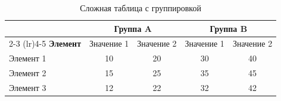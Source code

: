 \documentclass[12pt,a4paper]{article}
\begin{document}
\begin{table}[h!]
    \centering
    \caption{Сложная таблица с группировкой}
    \label{tab:complex}
    
    \begin{tabular}{lcccc}
        \toprule
                          & \multicolumn{2}{c}{\textbf{Группа A}} & \multicolumn{2}{c}{\textbf{Группа B}} \\
        \cmidrule(lr){2-3} \cmidrule(lr){4-5}
        \textbf{Элемент}  & Значение 1      & Значение 2      & Значение 1      & Значение 2      \\
        \midrule
        Элемент 1         & 10              & 20              & 30              & 40              \\
        Элемент 2         & 15              & 25              & 35              & 45              \\
        Элемент 3         & 12              & 22              & 32              & 42              \\
        \bottomrule
    \end{tabular}
\end{table}
\end{document}
